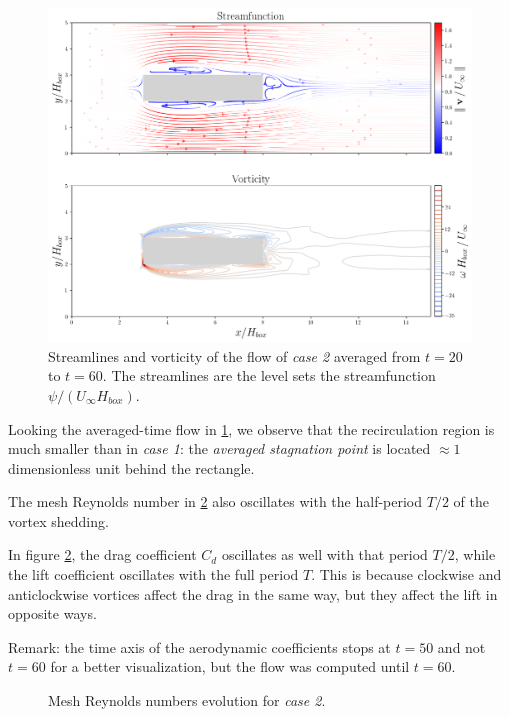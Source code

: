 \documentclass[11 pt]{article}
\begin{document}
\begin{figure}[H]
    \centering
    \includegraphics[width=\textwidth]{../figures/avg_flow_case_2.png}
    \caption{Streamlines and vorticity of the flow of \textit{case 2} averaged from $t=20$ to $t=60$. The streamlines are the level sets the streamfunction $\psi / (U_{\infty} H_{box})$.}
    \label{fig:averaging_2}
\end{figure}

Looking the averaged-time flow in \ref{fig:averaging_2}, we observe that the recirculation region is much smaller than in \textit{case 1}: the \textit{averaged stagnation point} is located $\approx 1$ dimensionless unit behind the rectangle.

The mesh Reynolds number in \ref{fig:mesh_re_case2} also oscillates with the half-period $T/2$ of the vortex shedding.

In figure \ref{fig:mesh_re_case2}, the drag coefficient $C_d$ oscillates as well with that period $T/2$, while the lift coefficient oscillates with the full period $T$. This is because clockwise and anticlockwise vortices affect the drag in the same way, but they affect the lift in opposite ways.

Remark: the time axis of the aerodynamic coefficients stops at $t=50$ and not $t=60$ for a better visualization, but the flow was computed until $t=60$.

\begin{figure}[H]
    \centering
    
    \caption{Mesh Reynolds numbers evolution for \textit{case 2}.}
    \label{fig:mesh_re_case2}
\end{figure}
\end{document}
